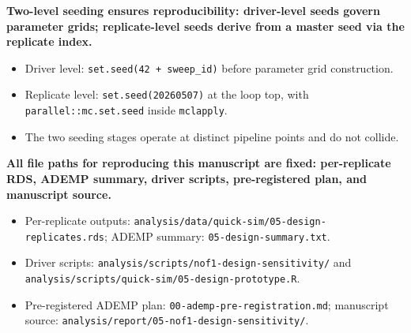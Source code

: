 \documentclass[
  11pt,
]{article}
\begin{document}
\textbf{Two-level seeding ensures reproducibility: driver-level seeds govern parameter grids; replicate-level seeds derive from a master seed via the replicate index.}

\begin{itemize}\setlength{\itemsep}{2pt}\setlength{\parskip}{0pt}
\item Driver level: \texttt{set.seed(42 + sweep\_id)} before parameter grid construction.
\item Replicate level: \texttt{set.seed(20260507)} at the loop top, with \texttt{parallel::mc.set.seed} inside \texttt{mclapply}.
\item The two seeding stages operate at distinct pipeline points and do not collide.
\end{itemize}

\textbf{All file paths for reproducing this manuscript are fixed: per-replicate RDS, ADEMP summary, driver scripts, pre-registered plan, and manuscript source.}

\begin{itemize}\setlength{\itemsep}{2pt}\setlength{\parskip}{0pt}
\item Per-replicate outputs: \texttt{analysis/data/quick-sim/05-design-replicates.rds}; ADEMP summary: \texttt{05-design-summary.txt}.
\item Driver scripts: \texttt{analysis/scripts/nof1-design-sensitivity/} and \texttt{analysis/scripts/quick-sim/05-design-prototype.R}.
\item Pre-registered ADEMP plan: \texttt{00-ademp-pre-registration.md}; manuscript source: \texttt{analysis/report/05-nof1-design-sensitivity/}.
\end{itemize}
\end{document}
